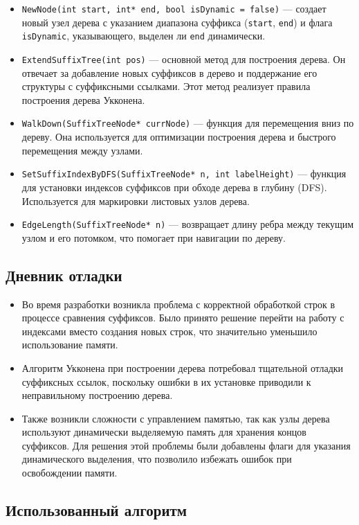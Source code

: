 \documentclass[12pt]{article}
\begin{document}
\begin{itemize}
    \item \texttt{NewNode(int start, int* end, bool isDynamic = false)} — создает новый узел дерева с указанием диапазона суффикса (\texttt{start}, \texttt{end}) и флага \texttt{isDynamic}, указывающего, выделен ли \texttt{end} динамически.
    \item \texttt{ExtendSuffixTree(int pos)} — основной метод для построения дерева. Он отвечает за добавление новых суффиксов в дерево и поддержание его структуры с суффиксными ссылками. Этот метод реализует правила построения дерева Укконена.
    \item \texttt{WalkDown(SuffixTreeNode* currNode)} — функция для перемещения вниз по дереву. Она используется для оптимизации построения дерева и быстрого перемещения между узлами.
    \item \texttt{SetSuffixIndexByDFS(SuffixTreeNode* n, int labelHeight)} — функция для установки индексов суффиксов при обходе дерева в глубину (DFS). Используется для маркировки листовых узлов дерева.
    \item \texttt{EdgeLength(SuffixTreeNode* n)} — возвращает длину ребра между текущим узлом и его потомком, что помогает при навигации по дереву.
\end{itemize}

\subsection*{Дневник отладки}

\begin{itemize}
    \item Во время разработки возникла проблема с корректной обработкой строк в процессе сравнения суффиксов. Было принято решение перейти на работу с индексами вместо создания новых строк, что значительно уменьшило использование памяти.
    \item Алгоритм Укконена при построении дерева потребовал тщательной отладки суффиксных ссылок, поскольку ошибки в их установке приводили к неправильному построению дерева.
    \item Также возникли сложности с управлением памятью, так как узлы дерева используют динамически выделяемую память для хранения концов суффиксов. Для решения этой проблемы были добавлены флаги для указания динамического выделения, что позволило избежать ошибок при освобождении памяти.
\end{itemize}

\subsection*{Использованный алгоритм}
\end{document}
